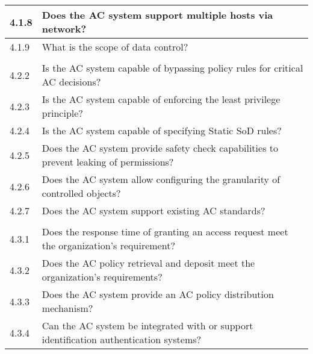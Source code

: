{\begin{table}[htb]
\begin{tabular}{l|l}
		4.1.8              & \llap{\textbullet} Does the AC system support multiple hosts via network?                                             \\ \hline
		4.1.9              & \llap{\textbullet} What is the scope of data control?                                                                 \\
		\hline \rowcolor{lightgray} \multicolumn{2}{l}{Enforcement Properties}                                                                     \\ \hline
		4.2.2              & \llap{\textbullet} Is the AC system capable of bypassing policy rules for critical AC decisions?                      \\ \hline
		4.2.3              & \llap{\textbullet} Is the AC system capable of enforcing the least privilege principle?                               \\ \hline
		4.2.4              & \llap{\textbullet} Is the AC system capable of specifying Static SoD rules?                                           \\ \hline
		4.2.5              & \llap{\textbullet} Does the AC system provide safety check capabilities to prevent leaking of permissions?            \\ \hline
		4.2.6              & \llap{\textbullet} Does the AC system allow configuring the granularity of controlled objects?                        \\ \hline
		4.2.7              & \llap{\textbullet} Does the AC system support existing AC standards?                                                  \\
		\hline \rowcolor{lightgray} \multicolumn{2}{l}{Performance Properties}                                                                     \\ \hline
		4.3.1              & \llap{\textbullet} Does the response time of granting an access request meet the organization’s requirement?          \\ \hline
		4.3.2              & \llap{\textbullet} Does the AC policy retrieval and deposit meet the organization’s requirements?                     \\ \hline
		4.3.3              & \llap{\textbullet} Does the AC system provide an AC policy distribution mechanism?                                    \\ \hline
		4.3.4              & \llap{\textbullet} Can the AC system be integrated with or support identification authentication systems?             \\

\end{tabular}
\end{table}}
